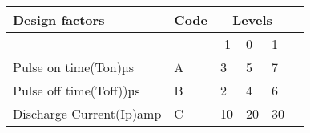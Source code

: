 \begin{minipage}{\linewidth}
	\centering
    	\begin{tabular}{|l|l|l|l|l|l|}
		\hline
		Design factors & Code & \multicolumn{3}{c|}{Levels} \\
		\hline
		~ & ~ & -1 & 0 & 1 \\ \hline
		Pulse on time(Ton)µs & A & 3 & 5 & 7 \\ \hline
		Pulse off time(Toff))µs & B & 2 & 4 & 6 \\ \hline
		Discharge Current(Ip)amp & C & 10 & 20 & 30 \\ \hline
     	\end{tabular}
	
\end{minipage}
